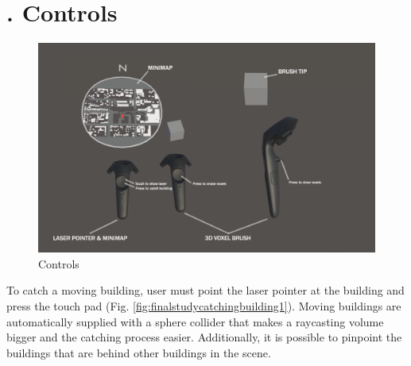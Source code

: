 \begin{appendices}
\begin{figure}
	\hfill
	\par\smallskip
	\hfill
\end{figure}

\chapter{. Controls}
\label{app:finalstudy_controls}
\begin{figure}[h]
	\centering
	\includegraphics[width=\linewidth]{figures/finalstudy_controllers}
	\caption{Controls}
	\label{fig:finalstudycontrollers}
\end{figure}

To catch a moving building, user must point the laser pointer at the building and press the touch pad (Fig. \ref{fig:finalstudycatchingbuilding1}). Moving buildings are automatically supplied with a sphere collider that makes a raycasting volume bigger and the catching process easier. Additionally, it is possible to pinpoint the buildings that are behind other buildings in the scene.

\begin{figure}
	\centering
	

\end{figure}
\end{appendices}
